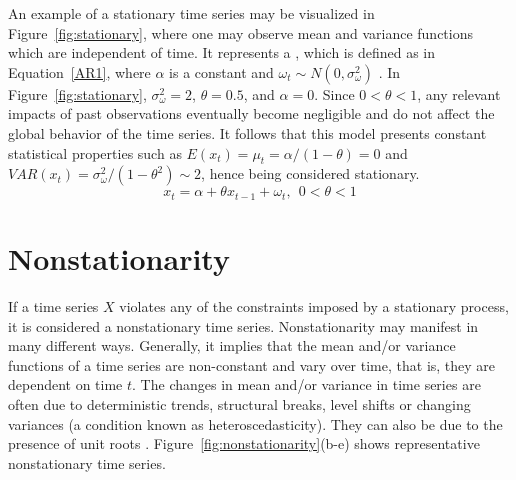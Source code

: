 \documentclass[11pt]{dippg}
\begin{document}
An example of a stationary time series may be visualized in Figure~\ref{fig:stationary}, where one may observe mean and variance functions which are independent of time. It represents a , which is defined as in Equation~\ref{AR1}, where $\alpha$ is a constant and $\omega_t \sim N(0, \sigma^2_\omega)$ \cite{gujarati_basic_2002}. In Figure~\ref{fig:stationary}, $\sigma^2_\omega = 2$, $\theta = 0.5$, and $\alpha = 0$. Since $0 < \theta < 1$, any relevant impacts of past observations eventually become negligible and do not affect the global behavior of the time series. It follows that this model presents constant statistical properties such as $E(x_t) = \mu_t = \alpha/(1-\theta) = 0$ and $VAR(x_t) = \sigma^2_\omega/(1-\theta^2) \sim 2$, hence being considered stationary. 
\begin{equation}\label{AR1}
x_t = \alpha + {\theta}x_{t-1} + \omega_t, \ \ 0 < \theta < 1
\end{equation}

\section{Nonstationarity} \label{Nonstat}

If a time series $X$ violates any of the constraints imposed by a stationary process, it is considered a nonstationary time series. Nonstationarity may manifest in many different ways. Generally, it implies that the mean and/or variance functions of a time series are non-constant and vary over time, that is, they are dependent on time $t$. The changes in mean and/or variance in time series are often due to deterministic trends, structural breaks, level shifts or changing variances (a condition known as heteroscedasticity). They can also be due to the presence of unit roots \cite{hanssens_market_2003}. Figure~\ref{fig:nonstationarity}(b-e) shows representative nonstationary time series.
\end{document}

